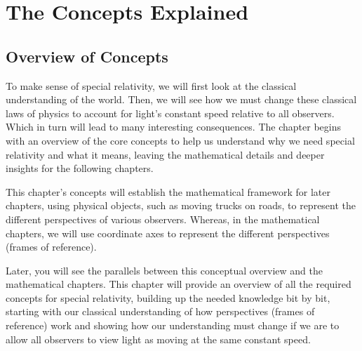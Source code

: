 \mainmatter

\part{The Concepts Explained} %

\chapter{Overview of Concepts} \label{ch: Conceptual Overview}

To make sense of special relativity, we will first look at the classical understanding of the world.
Then, we will see how we must change these classical laws of physics to account for light's constant speed relative to all observers.
Which in turn will lead to many interesting consequences.
The chapter begins with an overview of the core concepts to help us understand why we need special relativity and what it means, leaving the mathematical details and deeper insights for the following chapters.

This chapter's concepts will establish the mathematical framework for later chapters, using physical objects, such as moving trucks on roads, to represent the different perspectives of various observers.
Whereas, in the mathematical chapters, we will use coordinate axes to represent the different perspectives (frames of reference).

Later, you will see the parallels between this conceptual overview and the mathematical chapters.
This chapter will provide an overview of all the required concepts for special relativity, building up the needed knowledge bit by bit, starting with our classical understanding of how perspectives (frames of reference) work and showing how our understanding must change if we are to allow all observers to view light as moving at the same constant speed.

